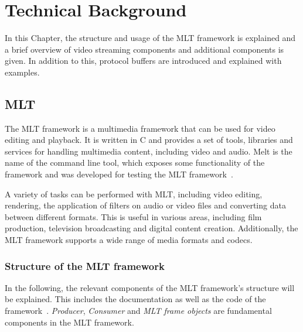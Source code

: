 \documentclass[../MasterThesis.tex]{subfiles}
\begin{document}
	
	

\newpage

\section{Technical Background} \label{section:technicalbackground}


In this Chapter, the structure and usage of the MLT framework is explained and a brief overview of video streaming components and additional components is given. In addition to this, protocol buffers are introduced and explained with examples.


\subsection{MLT} \label{subsection:melt}

The MLT framework is a multimedia framework that can be used for video editing and playback. It is written in C and provides a set of tools, libraries and services for handling multimedia content, including video and audio. Melt is the name of the command line tool, which exposes some functionality of the framework and was developed for testing the MLT framework~\cite{melt}. 




A variety of tasks can be performed with MLT, including video editing, rendering, the application of filters on audio or video files and converting data between different formats. 
This is useful in various areas, including film production, television broadcasting and digital content creation. 
Additionally, the MLT framework supports a wide range of media formats and codecs.




\subsubsection*{Structure of the MLT framework}


In the following, the relevant components of the MLT framework's structure will be explained. This includes the documentation as well as the code of the framework~\cite{melt, melt_code}.
%
\textit{Producer}, \textit{Consumer} and \textit{MLT frame objects} are fundamental components in the MLT framework.
\end{document}
